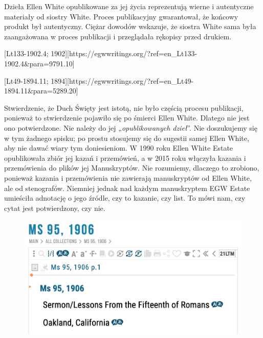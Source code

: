 Dzieła Ellen White opublikowane za jej życia reprezentują wierne i autentyczne materiały od siostry White. Proces publikacyjny gwarantował, że końcowy produkt był autentyczny. Ciężar dowodów wskazuje, że siostra White sama była zaangażowana w proces publikacji i przeglądała rękopisy przed drukiem.

[Lt133-1902.4; 1902][https://egwwritings.org/?ref=en\_Lt133-1902.4&para=9791.10]

[Lt49-1894.11; 1894][https://egwwritings.org/?ref=en\_Lt49-1894.11&para=5289.20]

Stwierdzenie, że Duch Święty jest istotą, nie było częścią procesu publikacji, ponieważ to stwierdzenie pojawiło się po śmierci Ellen White. Dlatego nie jest ono potwierdzone. Nie należy do jej „\textit{opublikowanych dzieł}”. Nie doszukujemy się w tym żadnego spisku; po prostu stosujemy się do sugestii samej Ellen White, aby nie dawać wiary tym doniesieniom. W 1990 roku Ellen White Estate opublikowała zbiór jej kazań i przemówień, a w 2015 roku włączyła kazania i przemówienia do plików jej Manuskryptów. Nie rozumiemy, dlaczego to zrobiono, ponieważ kazania i przemówienia nie zawierają manuskryptów od Ellen White, ale od stenografów. Niemniej jednak nad każdym manuskryptem EGW Estate umieściła adnotację o jego źródle, czy to kazanie, czy list. To mówi nam, czy cytat jest potwierdzony, czy nie.

\begin{figure}
    \centering
    \includegraphics[width=1\linewidth]{images/sermons-and-talks.png}
    \label{fig:enter-label}
\end{figure}


